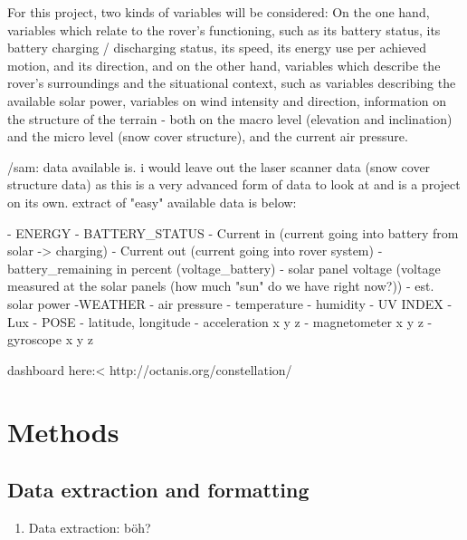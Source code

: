\documentclass[11pt, UKenglish]{report}
\begin{document}
{For this project, two kinds of variables will be considered: On the one hand, variables which relate to the rover's functioning, such as its battery status, its battery charging / discharging status, its speed, its energy use per achieved motion, and its direction, and on the other hand, variables which describe the rover's surroundings and the situational context, such as variables describing the available solar power, variables on wind intensity and direction, information on the structure of the terrain - both on the macro level (elevation and inclination) and the micro level (snow cover structure), and the current air pressure.

/sam:  data available is. i would leave out the laser scanner data (snow cover structure data) as this is a very advanced form of data to look at and is a project on its own. extract of "easy" available data is below:

- ENERGY
	- BATTERY_STATUS
		- Current in (current going into battery from solar -> charging)
		- Current out (current going into rover system)
		- battery_remaining in percent (voltage_battery)
		- solar panel voltage (voltage measured at the solar panels (how much "sun" do we have right now?))
		- est. solar power
-WEATHER
		 - air pressure
		 - temperature
		 - humidity
		- UV INDEX
		- Lux
- POSE
	- latitude, longitude
	- acceleration x y z
	- magnetometer x y z
	- gyroscope x y z

dashboard here:<
http://octanis.org/constellation/





\section*{Methods}

\subsection*{Data extraction and formatting}

\begin{enumerate}

	\item{\large{Data extraction:} \normalsize böh? }


\end{enumerate}}
\end{document}
